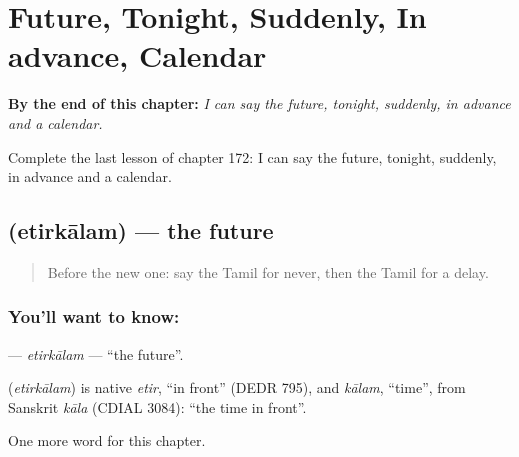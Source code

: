 
\chapter{Future, Tonight, Suddenly, In advance, Calendar}
\label{ch:ta-future-tonight-suddenly-in-advance-calendar}

\begin{chapteropening}
\textbf{By the end of this chapter:} \emph{I can say the future, tonight, suddenly, in advance and a calendar.}

Complete the last lesson of chapter 172: I can say the future, tonight, suddenly, in advance and a calendar.
\end{chapteropening}

\section[\texorpdfstring{\ta{எதிர்காலம்} (etirkālam)}{எதிர்காலம் (etirkālam)}]{ (etirkālam) — the future}

\label{lesson:TA-C172-etirkalam}



\begin{quote}
Before the new one: say the Tamil for never, then the Tamil for a delay.
\end{quote}

\subsection*{You'll want to know: }
\textbf{} — \emph{etirkālam} — \textquotedblleft{}the future\textquotedblright{}.

\begin{cousinweb}
\textbf{} (\emph{etirkālam}) is native \emph{etir}, \textquotedblleft{}in front\textquotedblright{} (DEDR 795), and \emph{kālam}, \textquotedblleft{}time\textquotedblright{}, from Sanskrit \emph{kāla} (CDIAL 3084): \textquotedblleft{}the time in front\textquotedblright{}.
\end{cousinweb}

\begin{grammarlens}[title={What you've built}]
One more word for this chapter.
\end{grammarlens}

